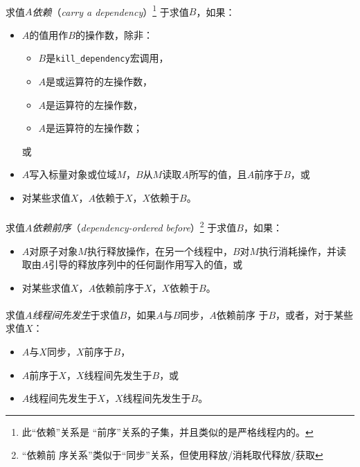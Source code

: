 \paragraph{}
求值$A$\textit{依赖}（\textit{carry a dependency}）\footnote{此``依赖''关系是
``前序''关系的子集，并且类似的是严格线程内的。} 于求值$B$，如果：
\begin{itemize}
  \item{$A$的值用作$B$的操作数，除非：
    \begin{itemize}
      \item{$B$是\texttt{kill\_dependency}宏调用，}
      \item{$A$是\tm{\&\&}或\tm{||}运算符的左操作数，}
      \item{$A$是运算符的左操作数，}
      \item{$A$是\tm{,}运算符的左操作数；}
    \end{itemize}
    或}
  \item{$A$写入标量对象或位域$M$，$B$从$M$读取$A$所写的值，且$A$前序于$B$，或}
  \item{对某些求值$X$，$A$依赖于$X$，$X$依赖于$B$。}
\end{itemize}

\paragraph{}
求值$A$\textit{依赖前序}（\textit{dependency-ordered before}）\footnote{``依赖前
序关系''类似于``同步''关系，但使用释放/消耗取代释放/获取} 于求值$B$，如果：
\begin{itemize}
  \item{$A$对原子对象$M$执行释放操作，在另一个线程中，$B$对$M$执行消耗操作，并读
    取由$A$引导的释放序列中的任何副作用写入的值，或}
  \item{对某些求值$X$，$A$依赖前序于$X$，$X$依赖于$B$。}
\end{itemize}

\paragraph{}
求值$A$\textit{线程间先发生}于求值$B$，如果$A$与$B$同步，$A$依赖前序
于$B$，或者，对于某些求值$X$：
\begin{itemize}
  \item{$A$与$X$同步，$X$前序于$B$，}
  \item{$A$前序于$X$，$X$线程间先发生于$B$，或}
  \item{$A$线程间先发生于$X$，$X$线程间先发生于$B$。}
\end{itemize}

